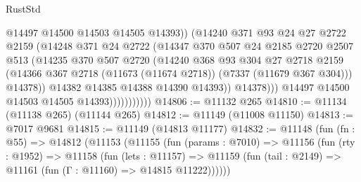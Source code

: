 \begin{lexlean}{RustStd}
\begin{coremodule}
                                  @14497
                                  @14500
                                  @14503
                                  @14505
                                  @14393))
                              (@14240
                                @371
                                @93
                                @24
                                @27
                                @2722
                                @2159
                                (@14248
                                  @371
                                  @24
                                  @2722
                                  (@14347
                                    @370
                                    @507
                                    @24
                                    @2185
                                    @2720
                                    @2507
                                    @513
                                    (@14235
                                      @370
                                      @507
                                      @2720
                                      (@14240
                                        @368
                                        @93
                                        @304
                                        @27
                                        @2718
                                        @2159
                                        (@14366
                                          @367
                                          @2718
                                          (@11673 (@11674 @2718))
                                          (@7337 (@11679 @367 @304)))
                                        @14378))
                                    @14382
                                    @14385
                                    @14388
                                    @14390
                                    @14393))
                                @14378)))
                          @14497
                          @14500
                          @14503
                          @14505
                          @14393)))))))))))
@14806 := @11132 @265
@14810 := @11134 (@11138 @265) (@11144 @265)
@14812 := @11149 (@11008 @11150)
@14813 := @7017 @9681
@14815 := @11149 (@14813 @11177)
@14832 := @11148
    (fun (fn : @55) =>
    @14812
      (@11153
        (@11155
          (fun (params : @7010) =>
          @11156
            (fun (rty : @1952) =>
            @11158
              (fun (lets : @11157) =>
              @11159 (fun (tail : @2149) => @11161 (fun (Γ : @11160) => @14815 @11222))))))

\end{coremodule}
\end{lexlean}

